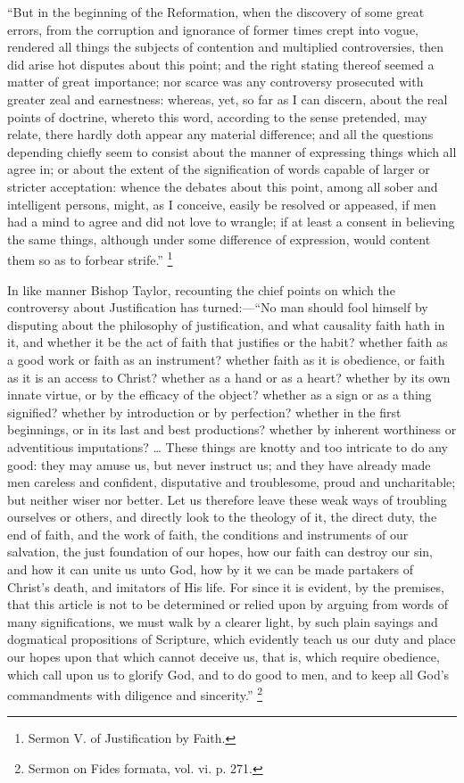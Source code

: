 ``But in the beginning of the Reformation, when the discovery
of some great errors, from the corruption and ignorance of former
times crept into vogue, rendered all things the subjects of contention
and multiplied controversies, then did arise hot disputes about this
point; and the right stating thereof seemed a matter of great
importance; nor scarce was any controversy prosecuted with greater
zeal and earnestness: whereas, yet, so far as I can discern, about the
real points of doctrine, whereto this word, according to the sense
pretended, may relate, there hardly doth appear any material
difference; and all the questions depending chiefly seem to consist
about the manner of expressing things which all agree in; or about the
extent of the signification of words capable of larger or stricter
acceptation: whence the debates about this point, among all sober and
intelligent persons, might, as I conceive, easily be resolved or
appeased, if men had a mind to agree and did not love to wrangle; if
at least a consent in believing the same things, although under some
difference of expression, would content them so as to forbear
strife.'' \footnote{Sermon V. of Justification by Faith.}

In like manner Bishop Taylor, recounting the chief points on which
the controversy about Justification has turned:—``No man should
fool himself by disputing about the philosophy of justification, and
what causality faith hath in it, and whether it be the act of faith
that justifies or the habit? whether faith as a good work or faith as
an instrument? whether faith as it is obedience, or faith as it is an
access to Christ? whether as a hand or as a heart? whether by its own
innate virtue, or by the efficacy of the object? whether as a sign or
as a thing signified? whether by introduction or by perfection?
whether in the first beginnings, or in its last and best productions?
whether by inherent worthiness or adventitious imputations? … These
things are knotty and too intricate to do any good: they may amuse us,
but never instruct us; and they have already made men careless and
confident, disputative and troublesome, proud and uncharitable; but
neither wiser nor better. Let us therefore leave these weak ways of
troubling ourselves or others, and directly look to the theology of
it, the direct duty, the end of faith, and the work of faith,
the conditions and instruments of our salvation, the just foundation
of our hopes, how our faith can destroy our sin, and how it can unite
us unto God, how by it we can be made partakers of Christ's death, and
imitators of His life. For since it is evident, by the premises, that
this article is not to be determined or relied upon by arguing from
words of many significations, we must walk by a clearer light, by such
plain sayings and dogmatical propositions of Scripture, which
evidently teach us our duty and place our hopes upon that which cannot
deceive us, that is, which require obedience, which call upon us to
glorify God, and to do good to men, and to keep all God's commandments
with diligence and sincerity.'' \footnote{Sermon on Fides
formata, vol. vi. p. 271.}

